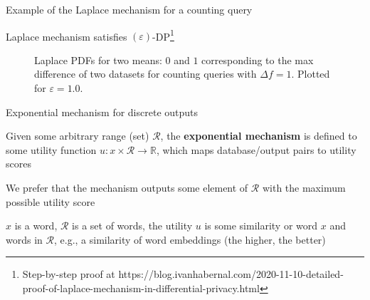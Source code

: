 \documentclass[12pt,aspectratio=169,handout]{beamer}
\begin{document}
\begin{frame}{Example of the Laplace mechanism for a counting query}

Laplace mechanism satisfies $(\varepsilon)$-DP\footnote{
Step-by-step proof at	https://blog.ivanhabernal.com/2020-11-10-detailed-proof-of-laplace-mechanism-in-differential-privacy.html}

\begin{figure}
	\caption{Laplace PDFs for two means: $0$ and $1$ corresponding to the max difference of two datasets for counting queries with $\Delta f = 1$. Plotted for $\varepsilon = 1.0$.}
\end{figure}



\end{frame}

\begin{frame}{Exponential mechanism for discrete outputs}

Given some arbitrary range (set) $\mathcal{R}$, the \textbf{exponential mechanism} is defined to some utility function $u: x \times \mathcal{R} \to \mathbb{R}$, which maps database/output pairs to utility scores


We prefer that the mechanism outputs some element of $\mathcal{R}$ with the maximum possible utility score

\begin{example}
$x$ is a word, $\mathcal{R}$ is a set of words, the utility $u$ is some similarity or word $x$ and words in $\mathcal{R}$, e.g., a similarity of word embeddings (the higher, the better)
\end{example}


\end{frame}
\end{document}
